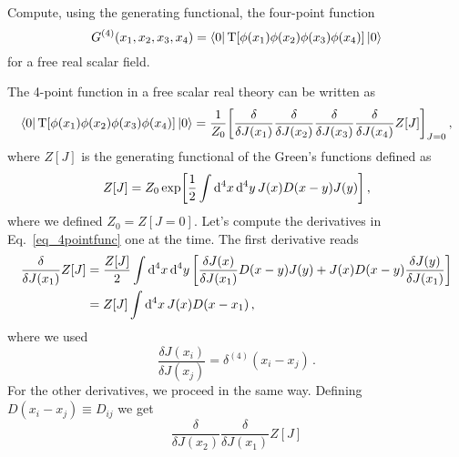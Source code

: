 \begin{ex} \label{ex_24} 
    Compute, using the generating functional, the four-point function
    \begin{equation}
        G^{(4)}(x_{1}, x_{2}, x_{3}, x_{4}) = \bra{0}\mathbf{\rm T}[\phi(x_{1})\phi(x_{2})\phi(x_{3})\phi(x_{4})]\ket{0}
    \end{equation}
    for a free real scalar field.
\end{ex}


\begin{sol}
    The 4-point function in a free scalar real theory can be written as
    \begin{equation}
    \label{eq_4pointfunc}
        \bra{0}\mathbf{\rm T}[\phi(x_{1})\phi(x_{2})\phi(x_{3})\phi(x_{4})]\ket{0} = \frac{1}{Z_0}\biggl[\frac{\delta}{\delta J(x_1)}\frac{\delta}{\delta J(x_2)}\frac{\delta}{\delta J(x_3)}\frac{\delta}{\delta J(x_4)}Z[J]\biggr]_{J=0} \, ,
    \end{equation}
    where $Z[J]$ is the generating functional of the Green’s functions defined as
    \begin{equation}
        Z[J] = Z_0 \exp\biggl[\frac{1}{2}\int {\rm d}^{4}x\, {\rm d}^{4}y \, J(x)D(x-y)J(y)\biggr] \, ,
    \end{equation}
    where we defined $Z_0 = Z[J=0]$.
    Let's compute the derivatives in Eq.~\eqref{eq_4pointfunc} one at the time. The first derivative reads
    \begin{equation}
    \begin{split}
        \frac{\delta}{\delta J(x_{1})}Z[J] 
        = &\; \frac{Z[J]}{2} \int {\rm d}^{4}x \, {\rm d}^{4}y \left[\frac{\delta J(x)}{\delta J(x_1)} D(x-y) J(y) + J(x)D(x-y) \frac{\delta J(y)}{\delta J(x_1)} \right] \\
        = &\; Z[J] \int {\rm d}^{4}x \, J(x)D(x - x_1) \,,
    \end{split}
    \end{equation}
    where we used
    \begin{equation}
        \frac{\delta J(x_i)}{\delta J(x_j)} = \delta^{(4)}(x_i - x_j) \, .
    \end{equation}
    For the other derivatives, we proceed in the same way. Defining $D(x_i - x_j) \equiv D_{ij}$ we get
    \begin{equation}
        \frac{\delta}{\delta J(x_{2})}\frac{\delta}{\delta J(x_{1})}Z[J] 

\end{equation}
\end{sol}
